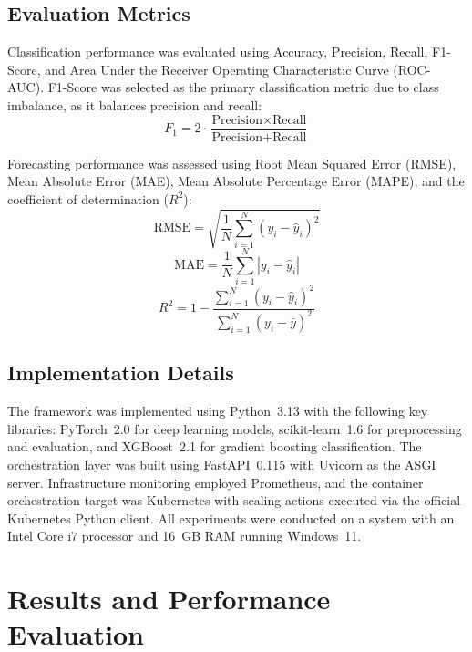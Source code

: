 \documentclass[sn-nature]{sn-jnl}
\theoremstyle{thmstyleone}
\theoremstyle{thmstyletwo}
\theoremstyle{thmstylethree}
\begin{document}
\subsection{Evaluation Metrics}\label{subsec:metrics}

Classification performance was evaluated using Accuracy, Precision, Recall, F1-Score, and Area Under the Receiver Operating Characteristic Curve (ROC-AUC). F1-Score was selected as the primary classification metric due to class imbalance, as it balances precision and recall:
\begin{equation}
F_1 = 2 \cdot \frac{\text{Precision} \times \text{Recall}}{\text{Precision} + \text{Recall}}
\end{equation}

Forecasting performance was assessed using Root Mean Squared Error (RMSE), Mean Absolute Error (MAE), Mean Absolute Percentage Error (MAPE), and the coefficient of determination ($R^2$):
\begin{equation}
\text{RMSE} = \sqrt{\frac{1}{N} \sum_{i=1}^{N} (y_i - \hat{y}_i)^2}
\end{equation}
\begin{equation}
\text{MAE} = \frac{1}{N} \sum_{i=1}^{N} |y_i - \hat{y}_i|
\end{equation}
\begin{equation}
R^2 = 1 - \frac{\sum_{i=1}^{N} (y_i - \hat{y}_i)^2}{\sum_{i=1}^{N} (y_i - \bar{y})^2}
\end{equation}

\subsection{Implementation Details}\label{subsec:implementation}

The framework was implemented using Python~3.13 with the following key libraries: PyTorch~2.0 for deep learning models, scikit-learn~1.6 for preprocessing and evaluation, and XGBoost~2.1 for gradient boosting classification. The orchestration layer was built using FastAPI~0.115 with Uvicorn as the ASGI server. Infrastructure monitoring employed Prometheus, and the container orchestration target was Kubernetes with scaling actions executed via the official Kubernetes Python client. All experiments were conducted on a system with an Intel Core i7 processor and 16~GB RAM running Windows~11.

\section{Results and Performance Evaluation}\label{sec:results}
\end{document}
